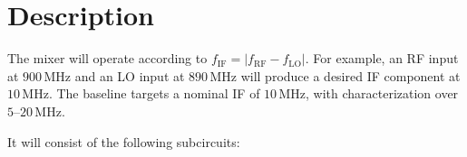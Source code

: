 
\section{Description}

The mixer will operate according to $f_{\mathrm{IF}}=\left|f_{\mathrm{RF}}-f_{\mathrm{LO}}\right|$.
For example, an RF input at \(900\,\mathrm{MHz}\) and an LO input at \(890\,\mathrm{MHz}\) will produce a desired IF component at \(10\,\mathrm{MHz}\).
The baseline targets a nominal IF of \(10\,\mathrm{MHz}\), with characterization over \(5\)--\(20\,\mathrm{MHz}\).

It will consist of the following subcircuits:

